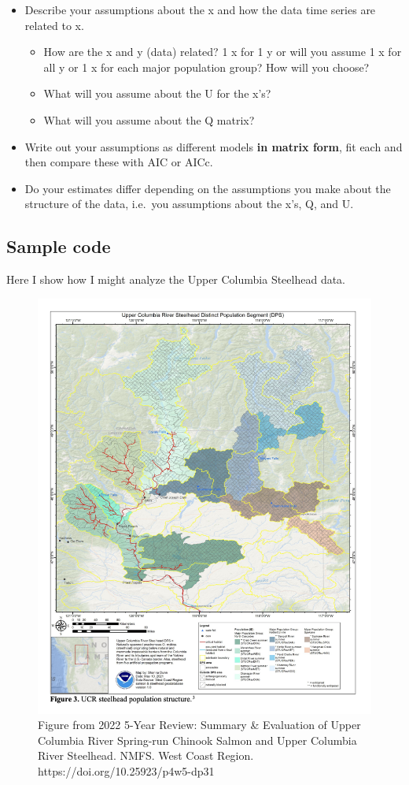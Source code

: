 \documentclass[
]{article}
\providecommand{\tightlist}{%
  \setlength{\itemsep}{0pt}\setlength{\parskip}{0pt}}
\begin{document}
\begin{itemize}
\item
  Describe your assumptions about the x and how the data time series are
  related to x.

  \begin{itemize}
  \tightlist
  \item
    How are the x and y (data) related? 1 x for 1 y or will you assume 1
    x for all y or 1 x for each major population group? How will you
    choose?
  \item
    What will you assume about the U for the x's?
  \item
    What will you assume about the Q matrix?
  \end{itemize}
\item
  Write out your assumptions as different models \textbf{in matrix
  form}, fit each and then compare these with AIC or AICc.
\item
  Do your estimates differ depending on the assumptions you make about
  the structure of the data, i.e.~you assumptions about the x's, Q, and
  U.
\end{itemize}

\hypertarget{sample-code}{%
\subsection{Sample code}\label{sample-code}}

Here I show how I might analyze the Upper Columbia Steelhead data.

\begin{figure}
\includegraphics[width=0.5\linewidth]{Data_Images/UCR-Steelhead-regions} \caption{Figure from 2022 5-Year Review: Summary & Evaluation of Upper Columbia River Spring-run Chinook Salmon and Upper Columbia River Steelhead. NMFS. West Coast Region. https://doi.org/10.25923/p4w5-dp31}\label{fig:unnamed-chunk-12}
\end{figure}
\end{document}
